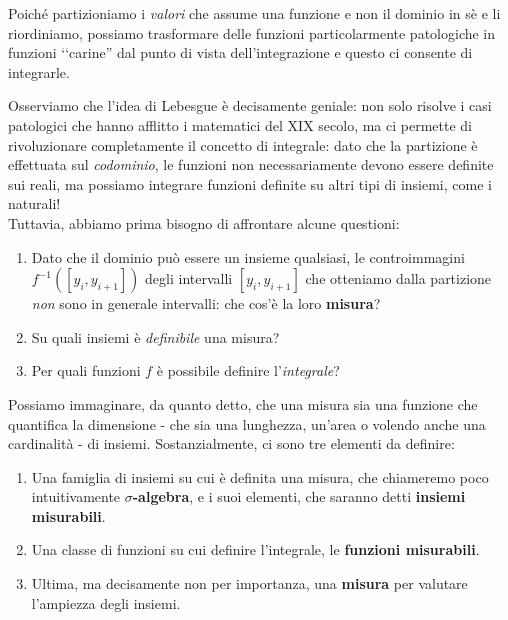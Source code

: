 \begin{intuit}
Poiché partizioniamo i \textit{valori} che assume una funzione e non il dominio in sè e li riordiniamo, possiamo trasformare delle funzioni particolarmente patologiche in funzioni ‘‘carine'' dal punto di vista dell'integrazione e questo ci consente di integrarle.
\end{intuit}
Osserviamo che l'idea di Lebesgue è decisamente geniale: non solo risolve i casi patologici che hanno afflitto i matematici del XIX secolo, ma ci permette di rivoluzionare completamente il concetto di integrale: dato che la partizione è effettuata sul \textit{codominio}, le funzioni non necessariamente devono essere definite sui reali, ma possiamo integrare funzioni definite su altri tipi di insiemi, come i naturali!\\
Tuttavia, abbiamo prima bisogno di affrontare alcune questioni:
\begin{enumerate}
	\item Dato che il dominio può essere un insieme qualsiasi, le controimmagini $f^{-1}\left(\left[y_i,y_{i+1}\right]\right)$ degli intervalli $\left[y_i,y_{i+1}\right]$ che otteniamo dalla partizione \textit{non} sono in generale intervalli: che cos'è la loro \textbf{misura}?
	\item Su quali insiemi è \textit{definibile} una misura?
	\item Per quali funzioni $f$ è possibile definire l'\textit{integrale}?
\end{enumerate}
Possiamo immaginare, da quanto detto, che una misura sia una funzione che quantifica la dimensione - che sia una lunghezza, un'area o volendo anche una cardinalità - di insiemi. Sostanzialmente, ci sono tre elementi da definire:
\begin{enumerate}[label=(\Roman*)]
	\item Una famiglia di insiemi su cui è definita una misura, che chiameremo poco intuitivamente $\sigma$\textbf{-algebra}, e i suoi elementi, che saranno detti \textbf{insiemi misurabili}.
	\item Una classe di funzioni su cui definire l’integrale, le \textbf{funzioni misurabili}.
	\item Ultima, ma decisamente non per importanza, una \textbf{misura} per valutare l’ampiezza degli insiemi.
\end{enumerate}
